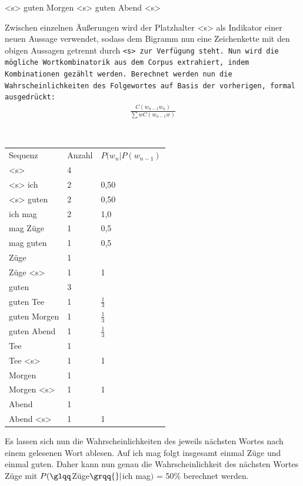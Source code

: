 \documentclass[12pt]{report}
\begin{document}
<s> guten Morgen <s> guten Abend <s>
\\ \rm

Zwischen einzelnen Äußerungen wird der Platzhalter <s> als Indikator einer neuen Aussage verwendet, sodass dem Bigramm nun eine Zeichenkette mit den obigen Aussagen getrennt durch \tt <s> \rm zur Verfügung steht. Nun wird die mögliche Wortkombinatorik aus dem Corpus extrahiert, indem Kombinationen gezählt werden. Berechnet werden nun die Wahrscheinlichkeiten des Folgewortes auf Basis der vorherigen, formal ausgedrückt: \begin{align}
\frac{C(w_{n-1} w_{n})}{\sum{w}{}C(w_{n-1}w)}
\end{align}

\tt
\begin{tabular}{lll}
Sequenz & Anzahl & $P(w_{n}|P(w_{n-1})$ \\
<s> & 4 & \\
<s> ich & 2 & 0,50 \\
<s> guten & 2 & 0,50 \\ 
ich mag & 2 & 1,0 \\ 
mag Züge & 1 & 0,5 \\
mag guten & 1 & 0,5 \\
Züge & 1 & \\
Züge <s> & 1 & 1 \\
guten & 3 & \\
guten Tee & 1 & $\frac{1}{3}$ \\
guten Morgen & 1 & $\frac{1}{3}$ \\
guten Abend & 1 & $\frac{1}{3}$ \\
Tee & 1 & \\
Tee <s> & 1 & 1 \\
Morgen & 1 & \\
Morgen <s> & 1 & 1 \\
Abend & 1 & \\
Abend <s> & 1 & 1\\
\end{tabular}
\rm
Es lassen sich nun die Wahrscheinlichkeiten des jeweils nächsten Wortes nach einem gelesenen Wort ablesen. Auf \glqq  ich mag\grqq{} folgt insgesamt einmal \glqq  Züge\grqq{} und einmal \glqq  guten\grqq{}. Daher kann nun genau die Wahrscheinlichkeit des nächsten Wortes \glqq  Züge\grqq{} mit $P(\glqq  $Züge$\grqq{}|$\glqq  ich mag\grqq{}$)$ = 50\% berechnet werden.
\end{document}

